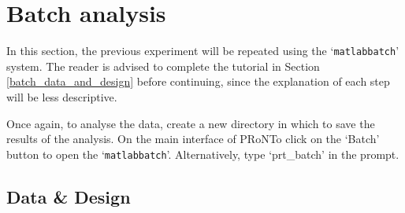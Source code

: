 \section{Batch analysis}

In this section, the previous experiment will be repeated using the `\texttt{matlabbatch}' system. The reader is advised to complete the tutorial in Section \ref{batch_data_and_design} before continuing, since the explanation of each step will be less descriptive.

Once again, to analyse the data, create a new directory in which to save the results of the analysis. On the main interface of PRoNTo click on the `Batch' button to open the `{\tt matlabbatch}'. Alternatively, type `prt\_batch' in the \matlab{} prompt.

\subsection{Data \& Design}

